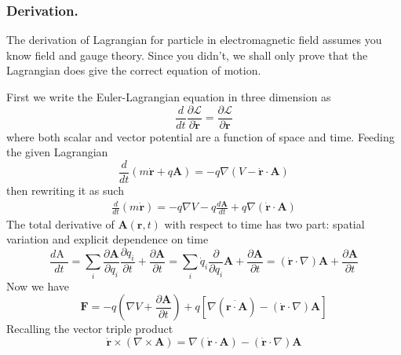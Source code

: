 \documentclass[../../../main.tex]{subfiles}
\begin{document}
\subsubsection*{Derivation.}
The derivation of Lagrangian for particle in electromagnetic field assumes you know field and gauge theory.
Since you didn't, we shall only prove that the Lagrangian does give the correct equation of motion.

First we write the Euler-Lagrangian equation in three dimension as 
\begin{equation*}
	\frac{d }{dt }\frac{\partial \mathcal{L }}{\partial \dot{\mathbf{r}}}=\frac{\partial \mathcal{L }}{\partial \mathbf{r}}
\end{equation*}
where both scalar and vector potential are a function of space and time.
Feeding the given Lagrangian
\begin{equation*}
	\frac{d }{dt }\left( m \dot{\mathbf{r}}+q \mathbf{A} \right) =-q \nabla \left( V-\dot{\mathbf{r} }\cdot\mathbf{A} \right) 
\end{equation*}
then rewriting it as such
\begin{align*}
	\frac{d }{dt }\left( m \dot{\mathbf{r}} \right) =-q \nabla V-q \frac{d \mathbf{A }}{dt }+ q \nabla \left( \dot{\mathbf{r }}\cdot \mathbf{A} \right) 
\end{align*}
The total derivative of $\mathbf{A}(\mathbf{r },t)$ with respect to time has two part: spatial variation and explicit dependence on time
\begin{equation*}
	\frac{d\mbox{A }}{dt}=\sum_i \frac{\partial \mathbf{A }}{\partial q_i}\frac{\partial q_i }{\partial t }+\frac{\partial \mathbf{A }}{\partial t }=\sum_i \dot{q}_i \frac{\partial }{\partial q_i }\mathbf{A}+ \frac{\partial \mathbf{A }}{\partial t }= \left( \dot{\mathbf{r }}\cdot \nabla\right)\mathbf{A}+ \frac{\partial \mathbf{A }}{\partial t}
\end{equation*}
Now we have 
\begin{equation*}
	\mathbf{F }=-q \left( \nabla  V+\frac{\partial \mathbf{A }}{\partial t} \right) +q \left[ \nabla \left( \dot{\mathbf{r }\cdot \mathbf{A }} \right)-\left( \dot{\mathbf{r}}\cdot \nabla   \right)\mathbf{A}   \right] 
\end{equation*}
Recalling the vector triple product
\begin{equation*}
	\dot{\mathbf{r }}\times \left( \nabla \times \mathbf{A }  \right)=\nabla \left( \dot{\mathbf{r }}\cdot \mathbf{A} \right)  -\left( \dot{\mathbf{r }}\cdot \nabla   \right) \mathbf{A}
\end{equation*}
\end{document}
